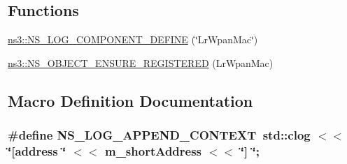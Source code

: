 \subsection*{Functions}
\begin{DoxyCompactItemize}
\item 
\hyperlink{namespacens3_ad3fc49efe7e91217ffdefd58d25f6e04}{ns3\+::\+N\+S\+\_\+\+L\+O\+G\+\_\+\+C\+O\+M\+P\+O\+N\+E\+N\+T\+\_\+\+D\+E\+F\+I\+NE} (\char`\"{}Lr\+Wpan\+Mac\char`\"{})
\item 
\hyperlink{namespacens3_a93457b789ad7c2823cfb3ff860488840}{ns3\+::\+N\+S\+\_\+\+O\+B\+J\+E\+C\+T\+\_\+\+E\+N\+S\+U\+R\+E\+\_\+\+R\+E\+G\+I\+S\+T\+E\+R\+ED} (Lr\+Wpan\+Mac)
\end{DoxyCompactItemize}


\subsection{Macro Definition Documentation}
\subsubsection[{\texorpdfstring{N\+S\+\_\+\+L\+O\+G\+\_\+\+A\+P\+P\+E\+N\+D\+\_\+\+C\+O\+N\+T\+E\+XT}{NS_LOG_APPEND_CONTEXT}}]{\setlength{\rightskip}{0pt plus 5cm}\#define N\+S\+\_\+\+L\+O\+G\+\_\+\+A\+P\+P\+E\+N\+D\+\_\+\+C\+O\+N\+T\+E\+XT~std\+::clog $<$$<$ \char`\"{}\mbox{[}address \char`\"{} $<$$<$ m\+\_\+short\+Address $<$$<$ \char`\"{}\mbox{]} \char`\"{};}\hypertarget{lr-wpan-mac_8cc_abe50035652d407c40bdaef78214c4955}{}\label{lr-wpan-mac_8cc_abe50035652d407c40bdaef78214c4955}
